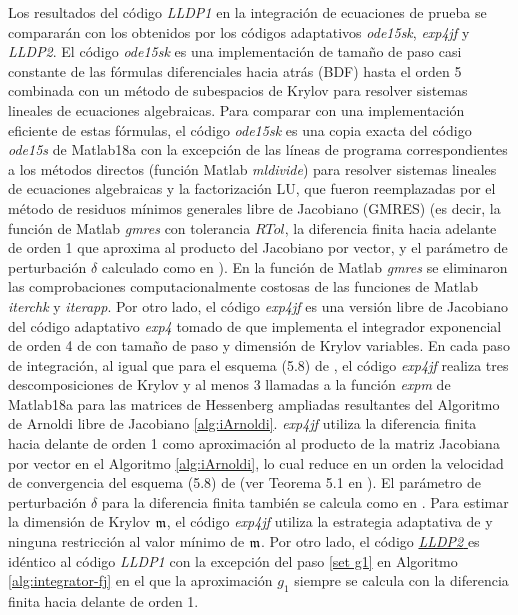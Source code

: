 Los resultados del código \emph{LLDP1} en la integración de ecuaciones de prueba se compararán con los obtenidos por los códigos adaptativos \emph{ode15sk}, \emph{exp4jf} y \emph{LLDP2}. El código \emph{ode15sk} es una implementación de tamaño de paso casi constante de las fórmulas diferenciales hacia atrás (BDF) hasta el orden 5 combinada con un método de subespacios de Krylov para resolver sistemas lineales de ecuaciones algebraicas. Para comparar con una implementación eficiente de estas fórmulas, el código \emph{ode15sk} es una copia exacta del código \emph{ode15s} \cite{shampine1997matlab} de Matlab18a con la excepción de las líneas de programa correspondientes a los métodos directos (función Matlab \emph{mldivide}) para resolver sistemas lineales de ecuaciones algebraicas y la factorización LU, que fueron reemplazadas por el método de residuos mínimos generales libre de Jacobiano (GMRES) (es decir, la función de Matlab \emph{gmres} con tolerancia $RTol$, la diferencia finita  hacia adelante de orden 1 que aproxima al producto del Jacobiano por  vector, y el parámetro de perturbación $\delta$ calculado como en \cite{knoll2004jacobian}). En la función de Matlab \emph{gmres} se eliminaron las comprobaciones computacionalmente costosas de las funciones de Matlab \emph{iterchk} y \emph{iterapp}. Por otro lado, el código \emph{exp4jf} es una versión libre de Jacobiano del código adaptativo \emph{exp4} tomado de \cite{jansing2011expode} que implementa el integrador exponencial de orden 4 de \cite{hochbruck1998exponential} con tamaño de paso y dimensión de Krylov variables.
En cada paso de integración, al igual que para el esquema (5.8) de \cite{hochbruck1998exponential}, el código \textit{exp4jf} realiza tres descomposiciones de Krylov y al menos 3 llamadas a la función \emph{expm} de Matlab18a para las matrices de Hessenberg ampliadas resultantes del Algoritmo de Arnoldi libre de Jacobiano \ref{alg:iArnoldi}. \textit{exp4jf} utiliza la diferencia finita hacia delante de orden 1 como aproximación al producto de la matriz Jacobiana por vector en el Algoritmo \ref{alg:iArnoldi}, lo cual reduce en un orden la velocidad de convergencia del esquema (5.8) de \cite{hochbruck1998exponential} (ver Teorema 5.1 en \cite{hochbruck1998exponential}).
El parámetro de perturbación $\delta$ para la diferencia finita también se calcula como en \cite{knoll2004jacobian}. Para estimar la dimensión de Krylov $\mathfrak{m}$, el código \textit{exp4jf} utiliza la estrategia adaptativa de \cite{hochbruck1998exponential} y ninguna restricción al valor mínimo de $\mathfrak{m}$. Por otro lado, el código \href{https://github.com/fsadannn/JF-LLDPschemes}{{\emph{LLDP2} \faExternalLink}} es idéntico al código \emph{LLDP1} con la excepción del paso \ref{set g1} en Algoritmo \ref{alg:integrator-fj} en el que la aproximación $g_1$ siempre se calcula con la diferencia finita hacia delante de orden 1. 

